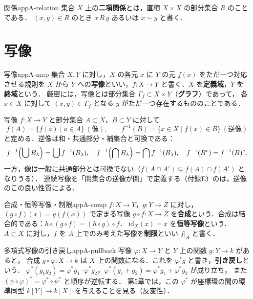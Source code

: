 \begin{mydef}{関係}{appA-relation}
集合 $X$ 上の\textbf{二項関係}とは，直積 $X\times X$ の部分集合 $R$ のことである．
$(x,y)\in R$ のとき $x\,R\,y$ あるいは $x\sim y$ と書く．
\end{mydef}

\section{写像}

\begin{mydef}{写像}{appA-map}
集合 $X,Y$ に対し，$X$ の各元 $x$ に $Y$ の元 $f(x)$ をただ一つ対応させる規則を
$X$ から $Y$ への\textbf{写像}といい，$f\colon X\to Y$ と書く．$X$ を\textbf{定義域}，$Y$ を\textbf{終域}という．
厳密には，写像とは部分集合 $\Gamma_f\subset X\times Y$（\textbf{グラフ}）であって，
各 $x\in X$ に対して $(x,y)\in\Gamma_f$ となる $y$ がただ一つ存在するもののことである．
\end{mydef}

写像 $f\colon X\to Y$ と部分集合 $A\subset X$，$B\subset Y$ に対して
\[
f(A)=\{f(a)\mid a\in A\}\ (\text{像}),\qquad
f^{-1}(B)=\{x\in X\mid f(x)\in B\}\ (\text{逆像})
\]
と定める．逆像は和・共通部分・補集合と可換である：
\[
f^{-1}\Bigl(\bigcup B_\lambda\Bigr)=\bigcup f^{-1}(B_\lambda),\quad
f^{-1}\Bigl(\bigcap B_\lambda\Bigr)=\bigcap f^{-1}(B_\lambda),\quad
f^{-1}(B^c)=f^{-1}(B)^c .
\]
一方，像は一般に共通部分とは可換でない（$f(A\cap A')\subsetneq f(A)\cap f(A')$ となりうる）．
連続写像を「開集合の逆像が開」で定義する（付録E）のは，逆像のこの良い性質による．

\begin{mydef}{合成・恒等写像・制限}{appA-comp}
$f\colon X\to Y$，$g\colon Y\to Z$ に対し，$(g\circ f)(x)=g(f(x))$ で定まる写像
$g\circ f\colon X\to Z$ を\textbf{合成}という．合成は結合的である：$h\circ(g\circ f)=(h\circ g)\circ f$．
$\mathrm{id}_X(x)=x$ を\textbf{恒等写像}という．
$A\subset X$ に対し，$f$ を $A$ 上でのみ考えた写像を\textbf{制限}といい $f|_A$ と書く．
\end{mydef}

\begin{myex}{多項式写像の引き戻し}{appA-pullback}
写像 $\varphi\colon X\to Y$ と $Y$ 上の関数 $g\colon Y\to k$ があると，
合成 $g\circ\varphi\colon X\to k$ は $X$ 上の関数になる．これを $\varphi^*g$ と書き，\textbf{引き戻し}という．
$\varphi^*(g_1g_2)=\varphi^*g_1\cdot\varphi^*g_2$，$\varphi^*(g_1+g_2)=\varphi^*g_1+\varphi^*g_2$ が成り立ち，
また $(\psi\circ\varphi)^*=\varphi^*\circ\psi^*$ と順序が逆転する．
第5章では，この $\varphi^*$ が座標環の間の環準同型 $k[Y]\to k[X]$ を与えることを見る（反変性）．
\end{myex}


